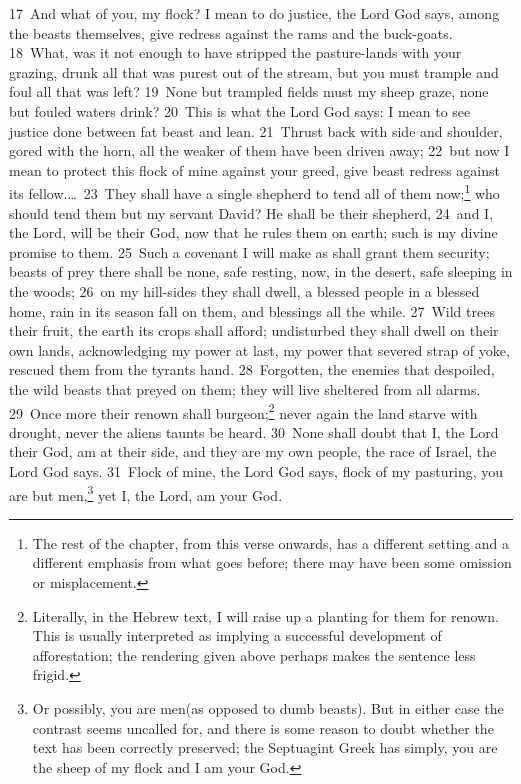 \documentclass[10pt]{book} %
\begin{document}
\textcolor{benred8}{17}~And what of you, my flock? I mean to do justice, the Lord God says, among the beasts themselves, give redress against the rams and the buck-goats. \textcolor{benred8}{18}~What, was it not enough to have stripped the pasture-lands with your grazing, drunk all that was purest out of the stream, but you must trample and foul all that was left? \textcolor{benred8}{19}~None but trampled fields must my sheep graze, none but fouled waters drink? \textcolor{benred8}{20}~This is what the Lord God says: I mean to see justice done between fat beast and lean. \textcolor{benred8}{21}~Thrust back with side and shoulder, gored with the horn, all the weaker of them have been driven away; \textcolor{benred8}{22}~but now I mean to protect this flock of mine against your greed, give beast redress against its fellow.\ldots\  \textcolor{benred8}{23}~They shall have a single shepherd to tend all of them now;\footnote[2]{The rest of the chapter, from this verse onwards, has a different setting and a different emphasis from what goes before; there may have been some omission or misplacement.} who should tend them but my servant David? He shall be their shepherd, \textcolor{benred8}{24}~and I, the Lord, will be their God, now that he rules them on earth; such is my divine promise to them. \textcolor{benred8}{25}~Such a covenant I will make as shall grant them security; beasts of prey there shall be none, safe resting, now, in the desert, safe sleeping in the woods; \textcolor{benred8}{26}~on my hill-sides they shall dwell, a blessed people in a blessed home, rain in its season fall on them, and blessings all the while. \textcolor{benred8}{27}~Wild trees their fruit, the earth its crops shall afford; undisturbed they shall dwell on their own lands, acknowledging my power at last, my power that severed strap of yoke, rescued them from the tyrant\textquotesingle s hand. \textcolor{benred8}{28}~Forgotten, the enemies that despoiled, the wild beasts that preyed on them; they will live sheltered from all alarms. \textcolor{benred8}{29}~Once more their renown shall burgeon;\footnote[3]{Literally, in the Hebrew text, \textasciigrave I will raise up a planting for them for renown\textquotesingle . This is usually interpreted as implying a successful development of afforestation; the rendering given above perhaps makes the sentence less frigid.} never again the land starve with drought, never the alien\textquotesingle s taunts be heard. \textcolor{benred8}{30}~None shall doubt that I, the Lord their God, am at their side, and they are my own people, the race of Israel, the Lord God says. \textcolor{benred8}{31}~Flock of mine, the Lord God says, flock of my pasturing, you are but men,\footnote[4]{Or possibly, \textasciigrave you are men\textquotesingle  (as opposed to dumb beasts). But in either case the contrast seems uncalled for, and there is some reason to doubt whether the text has been correctly preserved; the Septuagint Greek has simply, \textasciigrave you are the sheep of my flock and I am your God\textquotesingle .} yet I, the Lord, am your God.
\end{document}
